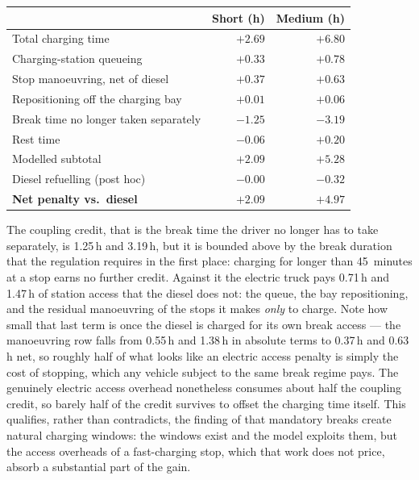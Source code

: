\begin{center}
\begin{tabular}{lrr}
\toprule
 & \textbf{Short (h)} & \textbf{Medium (h)} \\
\midrule
Total charging time                   & $+2.69$ & $+6.80$ \\
Charging-station queueing             & $+0.33$ & $+0.78$ \\
Stop manoeuvring, net of diesel       & $+0.37$ & $+0.63$ \\
Repositioning off the charging bay    & $+0.01$ & $+0.06$ \\
Break time no longer taken separately & $-1.25$ & $-3.19$ \\
Rest time                             & $-0.06$ & $+0.20$ \\
\midrule
Modelled subtotal                     & $+2.09$ & $+5.28$ \\
Diesel refuelling (post hoc)          & $-0.00$ & $-0.32$ \\
\midrule
\textbf{Net penalty vs.\ diesel}      & $\mathbf{+2.09}$ & $\mathbf{+4.97}$ \\
\bottomrule
\end{tabular}
\end{center}

The coupling credit, that is the break time the driver no longer has to take
separately, is 1.25\,h and 3.19\,h, but it is bounded above by the break
duration that the regulation requires in the first place: charging for longer
than 45~minutes at a stop earns no further credit.  Against it the electric
truck pays 0.71\,h and 1.47\,h of station access that the diesel does not: the
queue, the bay repositioning, and the residual manoeuvring of the stops it makes
\emph{only} to charge.  Note how small that last term is once the diesel is
charged for its own break access --- the manoeuvring row falls from 0.55\,h and
1.38\,h in absolute terms to 0.37\,h and 0.63\,h net, so roughly half of what
looks like an electric access penalty is simply the cost of stopping, which any
vehicle subject to the same break regime pays.  The genuinely electric access
overhead nonetheless consumes about half the coupling credit, so barely half of
the credit survives to offset the charging time itself.  This qualifies, rather
than contradicts, the finding of
\citet{brockmann_break-and-charge_2025} that mandatory breaks create natural
charging windows: the windows exist and the model exploits them, but the access
overheads of a fast-charging stop, which that work does not price, absorb a
substantial part of the gain.

